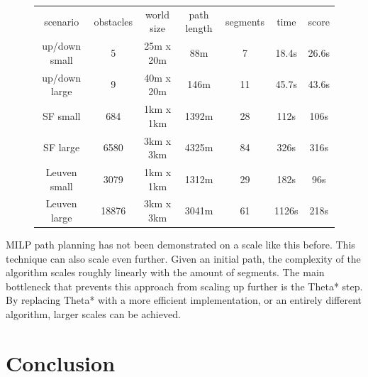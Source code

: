 \begin{figure}
\begin{tabular}{ c c c c c c c }
 scenario & obstacles & world size & path length & segments & time & score \\ 
up/down small & 5 &  25m x 20m & 88m  & 7 & 18.4s & 26.6s\\
up/down large & 9 & 40m x 20m &  146m & 11 & 45.7s & 43.6s \\
SF small & 684 & 1km x 1km & 1392m & 28 & 112s & 106s \\
SF large & 6580 & 3km x 3km & 4325m  & 84 & 326s  & 316s\\
Leuven small & 3079 & 1km x 1km & 1312m & 29 &  182s & 96s \\
Leuven large & 18876 & 3km x 3km & 3041m & 61 & 1126s & 218s \\

\end{tabular}
\end{figure}
MILP path planning has not been demonstrated on a scale like this before. This technique can also scale even further. Given an initial path, the complexity of the algorithm scales roughly linearly with the amount of segments. The main bottleneck that prevents this approach from scaling up further is the Theta* step. By replacing Theta* with a more efficient implementation, or an entirely different algorithm, larger scales can be achieved.

\section{Conclusion}